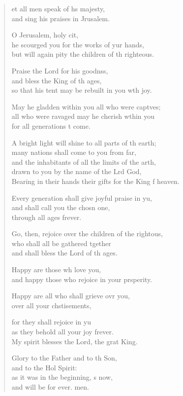 \begin{verse}
  \begin{patverse}
et all men speak of h\pointup{\i}s majesty,\Med\\
and sing his praises in Jrusalem.

O Jerusalem, holy cit,\Flex\\
he scourged you for the works of yur hands,\Med\\
but will again pity the children of th righteous.

Praise the Lord for his goodnss,\Flex\\
and bless the King of th ages,\Med\\
so that his tent may be rebuilt in you w\pointup{\i}th joy.

May he gladden within you all who were capt\pointup{\i}ves;\Flex\\
all who were ravaged may he cherish w\pointup{\i}thin you\Med\\
for all generations t come.

A bright light will shine to all parts of th earth;\Med\\
many nations shall come to you from far,\\
and the inhabitants of all the limits of the arth,\Flex\\
drawn to you by the name of the Lrd God,\Med\\
Bearing in their hands their gifts for the King f heaven.

Every generation shall give joyful praise in yu,\Flex\\
and shall call you the chosn one,\Med\\
through all ages frever.

Go, then, rejoice over the children of the rightous,\Flex\\
who shall all be gathered tgether\Med\\
and shall bless the Lord of th ages.

Happy are those wh love you,\Med\\
and happy those who rejoice in your prsperity.

Happy are all who shall grieve ovr you,\Med\\
over all your chstisements,

for they shall rejoice in yu\Flex\\
as they behold all your joy frever.\Med\\
My spirit blesses the Lord, the grat King.

Glory to the Father and to th Son,\Med\\
and to the Hol Spirit:\\
as it was in the beginning, \pointup{\i}s now,\Med\\
and will be for ever. men.

  \end{patverse}
\end{verse}
